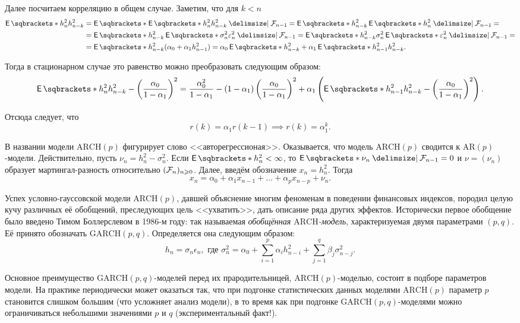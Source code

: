 Далее посчитаем корреляцию в общем случае. Заметим, что для \(k < n\)
\begin{align*}
	\E{h_{n}^{2}h_{n - k}^{2}} &= \E{\E{h_{n}^{2}h_{n - k}^{2} \given \F_{n - 
	1}}} = \E{h_{n - k}^{2}\E{h_{n}^{2} \given \F_{n - 1}}} = \\
	&= \E{h_{n - k}^{2}\E{\sigma_{n}^{2}\epsilon_{n}^{2} \given \F_{n - 1}}} =  
	\E{h_{n - k}^{2}\sigma_{n}^{2}\E{\epsilon_{n}^{2} \given \F_{n - 1}}} = \\
	&= \E{h_{n - k}^{2}(\alpha_{0} + \alpha_{1}h_{n - 1}^{2})} = 
	\alpha_{0}\E{h_{n - k}^{2}} + \alpha_{1}\E{h_{n - 1}^{2}h_{n - k}^{2}}.
\end{align*}

Тогда в стационарном случае это равенство можно преобразовать следующим образом:
\[
	\E{h_{n}^{2}h_{n - k}^{2}} - \left(\frac{\alpha_{0}}{1 - 
	\alpha_{1}}\right)^{2} = \frac{\alpha_{0}^{2}}{1 - 
	\alpha_{1}} - (1 - \alpha_{1})\left(\frac{\alpha_{0}}{1 - 
	\alpha_{1}}\right)^{2} + \alpha_{1}\left(\E{h_{n - 1}^{2}h_{n - k}^{2}} - 
	\left(\frac{\alpha_{0}}{1 - \alpha_{1}}\right)^{2}\right).
\]

Отсюда следует, что
\[
	r(k) = \alpha_{1}r(k - 1) \implies r(k) = \alpha_{1}^{k}.
\]

В названии модели \(\mathrm{ARCH}(p)\) фигурирует слово <<авторегрессионая>>. 
Оказывается, что модель \(\mathrm{ARCH}(p)\) сводится к 
\(\mathrm{AR}(p)\)-модели. Действительно, пусть \(\nu_{n} = h_{n}^{2} - 
\sigma_{n}^{2}\). Если \(\E{h_{n}^{2}} < \infty\), то \(\E{\nu_{n} \given \F_{n 
- 1}} = 0\) и \(\nu = (\nu_{n})\) образует мартингал-разность относительно 
\((\mathcal{F}_{n})_{n \geqslant 0}\). Далее, введём обозначение \(x_{n} = h_{n}^{2}\). Тогда
\[
	x_{n} = \alpha_{0} + \alpha_{1}x_{n - 1} + \ldots + \alpha_{p}x_{n - p} 
	+ \nu_{n}.
\]

Успех условно-гауссовской модели \(\mathrm{ARCH}(p)\), давшей объяснение многим 
феноменам в поведении финансовых индексов, породил целую кучу различных её 
обобщений, преследующих цель <<ухватить>>, дать описание ряда других эффектов. 
Исторически первое обобщение было введено Тимом Боллерслевом в 1986-м году: так 
называемая \emph{обобщённая \(\mathrm{ARCH}\)-модель}, характеризуемая двумя 
параметрами \((p, q)\). Её принято обозначать \(\mathrm{GARCH}(p, q)\). 
Определяется она следующим образом:
\[
	h_{n} = \sigma_{n}\epsilon_{n}, \text{ где } \sigma_{n}^{2} = \alpha_{0} + 
	\sum_{i = 1}^{p}\alpha_{i}h_{n - i}^{2} + \sum_{j = 1}^{q} 
	\beta_{j}\sigma_{n - j}^{2}.
\]

Основное преимущество \(\mathrm{GARCH}(p, q)\)-моделей перед их 
прародительницей, \(\mathrm{ARCH}(p)\)-моделью, состоит в подборе параметров 
модели. На практике периодически может оказаться так, что при подгонке 
статистических данных моделями \(\mathrm{ARCH}(p)\) параметр \(p\) становится 
слишком большим (что усложняет анализ модели), в то время как при подгонке 
\(\mathrm{GARCH}(p, q)\)-моделями можно ограничиваться небольшими значениями 
\(p\) и \(q\) (экспериментальный факт!).

